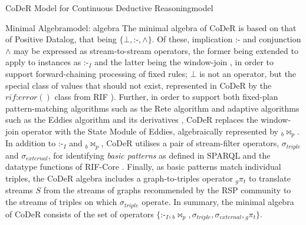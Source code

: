 \begin{nestedsection}{CoDeR Model for Continuous Deductive Reasoning}{model}
	\begin{nestedsection}{Minimal Algebra}{model: algebra}
		The minimal algebra of CoDeR is based on that of Positive Datalog, that being ${\{\bot, \text{:-}, \wedge\}}$.
		Of these, implication $\text{:-}$ and conjunction $\wedge$ may be expressed as stream-to-stream operators, the former being extended to apply to instances as $\text{:-}_I$ and the latter being the window-join \citep{ReteDBMS}, in order to support forward-chaining processing of fixed rules;
		$\bot$ is not an operator, but the special class of values that should not exist, represented in CoDeR by the ${rif\text{:}error()}$ class from RIF \citep{w3crif}).
		Further, in order to support both fixed-plan pattern-matching algorithms such as the Rete algorithm \citep{forgy79} and adaptive algorithms such as the Eddies algorithm \citep{eddies} and its derivatives \citep{CACQ,TCQ}, CoDeR replaces the window-join operator with the State Module of Eddies, algebraically represented by ${{}_b\Join_p}$.
		In addition to $\text{:-}_I$ and ${{}_b\Join_p}$, CoDeR utilises a pair of stream-filter operators, $\sigma_{triple}$ and $\sigma_{external}$, for identifying \emph{basic patterns} as defined in SPARQL \citep{w3csparql} and the datatype functions of RIF-Core \citep{w3crifcore}.
		Finally, as basic patterns match individual triples, the CoDeR algebra includes a graph-to-triples operator ${{}_g\pi_t}$ to translate streams $S$ from the streams of graphs recommended by the RSP community to the streams of triples on which $\sigma_{triple}$ operate.
		In summary, the minimal algebra of CoDeR consists of the set of operators ${\{\text{:-}_I, {}_b\Join_p, \sigma_{triple}, \sigma_{external}, {}_g\pi_t\}}$.


\end{nestedsection}
\end{nestedsection}
